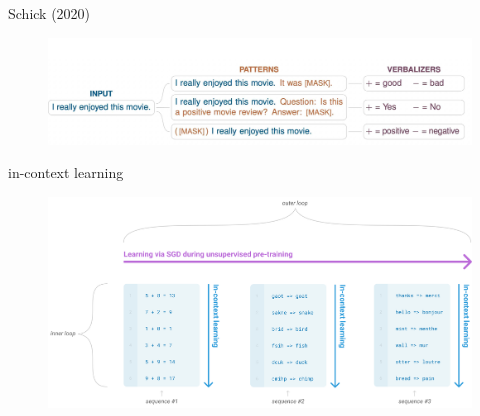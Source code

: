 \begin{frame}{Schick (2020)}

\vfill

\begin{figure}
		\centering
		\includegraphics[width=\linewidth]{figure/schick.png}\\
	\end{figure}

\vfill

\end{frame}


\begin{frame}{in-context learning}

\vfill

\begin{figure}
		\centering
		\includegraphics[clip,trim=200px 0 0 0,width=\linewidth]{figure/twotypesoflearning.png}\\
	\end{figure}

\vfill

\end{frame}


